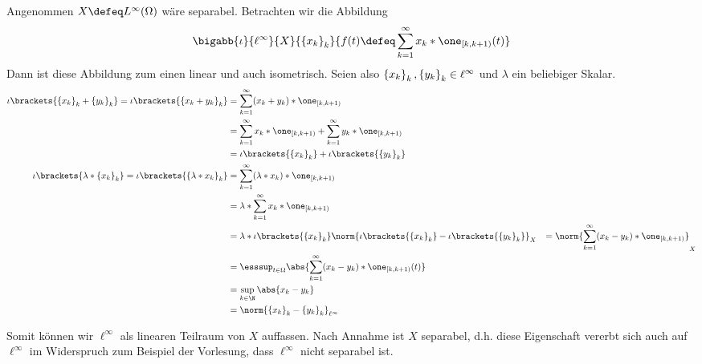 \begin{exercisePage}
\begin{enumerate}[label=(zu \alph*), leftmargin=\zulength]
	Angenommen $X \defeq L^\infty(\Omega)$ wäre separabel. 
%	
	Betrachten wir die Abbildung
	\begin{equation*}
		\bigabb{\iota}{\ell^\infty}{X}{\folge{x_k}{k}}{f(t) \defeq \sum_{k=1}^\infty x_k * \one_{[k,k+1)}(t)}
	\end{equation*}
	Dann ist diese Abbildung zum einen linear und auch isometrisch. Seien also $\left\{ x_k \right\}_{k}, \left\{ y_k \right\}_{k} \in \ell^\infty$ und $\lambda$ ein beliebiger Skalar.
	\begin{align*}
		\iota\brackets{\folge{x_k}{k} + \folge{y_k}{k}} 
		= \iota\brackets{\folge{x_k + y_k}{k}} 
		&= \sum_{k=1}^\infty (x_k + y_k) * \one_{[k,k+1)} \\
		&= \sum_{k=1}^\infty x_k * \one_{[k,k+1)} + \sum_{k=1}^\infty y_k * \one_{[k,k+1)} \\
		&= \iota\brackets{\folge{x_k}{k}} + \iota\brackets{\folge{y_k}{k}}\\
		\iota\brackets{\lambda * \folge{x_k}{k}} 
		= \iota\brackets{\folge{\lambda * x_k}{k}} 
		&= \sum_{k=1}^\infty (\lambda * x_k) * \one_{[k,k+1)} \\
		&= \lambda * \sum_{k=1}^\infty x_k * \one_{[k,k+1)} \\
		&= \lambda * \iota\brackets{\folge{x_k}{k}} 
		\norm{\iota\brackets{\folge{x_k}{k}} - \iota\brackets{\folge{y_k}{k}}}_X 
		&= \norm{\sum_{k=1}^\infty (x_k - y_k) * \one_{[k,k+1)}}_X \\
		&= \esssup_{t \in \Omega} \abs{\sum_{k=1}^\infty (x_k - y_k) * \one_{[k,k+1)}(t)} \\
		&= \sup_{k \in \N} \abs{x_k - y_k} \\
		&= \norm{\folge{x_k}{k} - \folge{y_k}{k}}_{\ell^\infty}
	\end{align*}
	
	Somit können wir $\ell^\infty$ als linearen Teilraum von $X$ auffassen. Nach Annahme ist $X$ separabel, d.h. diese Eigenschaft vererbt sich auch auf $\ell^\infty$ im Widerspruch zum Beispiel der Vorlesung, dass $\ell^\infty$ nicht separabel ist.
\end{enumerate}
\end{exercisePage}
